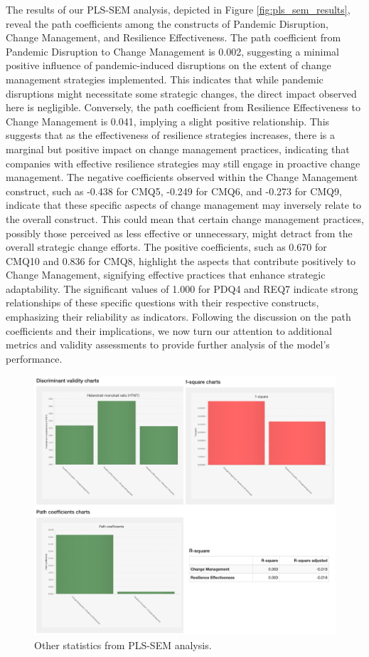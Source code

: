The results of our PLS-SEM analysis, depicted in Figure \ref{fig:pls_sem_results}, reveal the path coefficients among the constructs of Pandemic Disruption, Change Management, and Resilience Effectiveness. The path coefficient from Pandemic Disruption to Change Management is 0.002, suggesting a minimal positive influence of pandemic-induced disruptions on the extent of change management strategies implemented. This indicates that while pandemic disruptions might necessitate some strategic changes, the direct impact observed here is negligible. Conversely, the path coefficient from Resilience Effectiveness to Change Management is 0.041, implying a slight positive relationship. This suggests that as the effectiveness of resilience strategies increases, there is a marginal but positive impact on change management practices, indicating that companies with effective resilience strategies may still engage in proactive change management. The negative coefficients observed within the Change Management construct, such as -0.438 for CMQ5, -0.249 for CMQ6, and -0.273 for CMQ9, indicate that these specific aspects of change management may inversely relate to the overall construct. This could mean that certain change management practices, possibly those perceived as less effective or unnecessary, might detract from the overall strategic change efforts. The positive coefficients, such as 0.670 for CMQ10 and 0.836 for CMQ8, highlight the aspects that contribute positively to Change Management, signifying effective practices that enhance strategic adaptability. The significant values of 1.000 for PDQ4 and REQ7 indicate strong relationships of these specific questions with their respective constructs, emphasizing their reliability as indicators. Following the discussion on the path coefficients and their implications, we now turn our attention to additional metrics and validity assessments to provide further analysis of the model's performance.

\begin{figure}[h]
  \centering
  \includegraphics[width=1\textwidth]{figure/other_results.png}
  \caption{Other statistics from PLS-SEM analysis.}
  \label{fig:other_results}
\end{figure}

